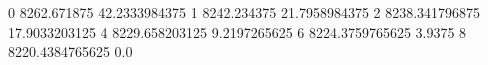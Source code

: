 0 8262.671875 42.2333984375
1 8242.234375 21.7958984375
2 8238.341796875 17.9033203125
4 8229.658203125 9.2197265625
6 8224.3759765625 3.9375
8 8220.4384765625 0.0
